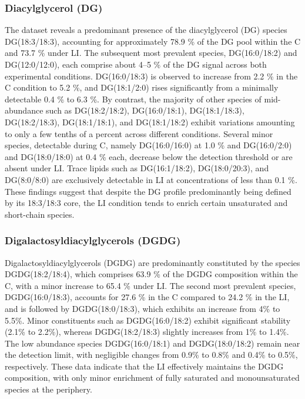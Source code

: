 \documentclass[10pt,letterpaper]{article}
\begin{document}
\begin{itemize}
\subsubsection*{Diacylglycerol (DG)} 
The dataset reveals a predominant presence of the diacylglycerol (DG) species DG(18:3/18:3), accounting for approximately 78.9 \% of the DG pool within the C and 73.7 \% under LI. The subsequent most prevalent species, DG(16:0/18:2) and DG(12:0/12:0), each comprise about 4–5 \% of the DG signal across both experimental conditions. DG(16:0/18:3) is observed to increase from 2.2 \% in the C condition to 5.2 \%, and DG(18:1/2:0) rises significantly from a minimally detectable 0.4 \% to 6.3 \%. By contrast, the majority of other species of mid-abundance such as DG(18:2/18:2), DG(16:0/18:1), DG(18:1/18:3), DG(18:2/18:3), DG(18:1/18:1), and DG(18:1/18:2) exhibit variations amounting to only a few tenths of a percent across different conditions. Several minor species, detectable during C, namely DG(16:0/16:0) at 1.0 \% and DG(16:0/2:0) and DG(18:0/18:0) at 0.4 \% each, decrease below the detection threshold or are absent under LI. Trace lipids such as DG(16:1/18:2), DG(18:0/20:3), and DG(8:0/8:0) are exclusively detectable in LI  at concentrations of less than 0.1 \%. These findings suggest that despite the DG profile predominantly being defined by its 18:3/18:3 core, the LI condition tends to enrich certain unsaturated and short-chain species.

\subsubsection*{Digalactosyldiacylglycerols (DGDG)} 
Digalactosyldiacylglycerols (DGDG) are predominantly constituted by the species DGDG(18:2/18:4), which comprises 63.9 \% of the DGDG composition within the C, with a minor increase to 65.4 \% under LI. The second most prevalent species, DGDG(16:0/18:3), accounts for 27.6 \% in the C  compared to 24.2 \% in the LI, and is followed by DGDG(18:0/18:3), which exhibits an increase from 4\% to 5.5\%. Minor constituents such as DGDG(16:0/18:2) exhibit significant stability (2.1\% to 2.2\%), whereas DGDG(18:2/18:3) slightly increases from 1\% to 1.4\%. The low abundance species DGDG(16:0/18:1) and DGDG(18:0/18:2) remain near the detection limit, with negligible changes from 0.9\% to 0.8\% and 0.4\% to 0.5\%, respectively. These data indicate that the LI effectively maintains the DGDG composition, with only minor enrichment of fully saturated and monounsaturated species at the periphery.


\end{itemize}
\end{document}
